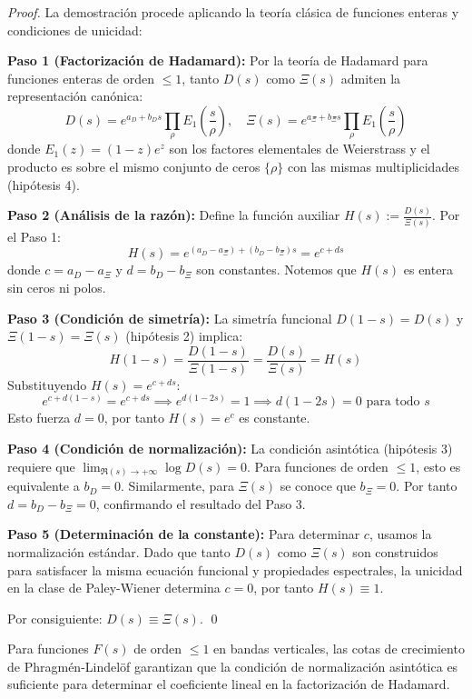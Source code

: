 \begin{proof}
La demostración procede aplicando la teoría clásica de funciones enteras y condiciones de unicidad:

\textbf{Paso 1 (Factorización de Hadamard):}
Por la teoría de Hadamard \cite{Hadamard1893} para funciones enteras de orden $\leq 1$,
tanto $D(s)$ como $\Xi(s)$ admiten la representación canónica:
\[
D(s) = e^{a_D + b_D s} \prod_{\rho} E_1\left(\frac{s}{\rho}\right), \quad
\Xi(s) = e^{a_\Xi + b_\Xi s} \prod_{\rho} E_1\left(\frac{s}{\rho}\right)
\]
donde $E_1(z) = (1-z)e^z$ son los factores elementales de Weierstrass y el producto
es sobre el mismo conjunto de ceros $\{\rho\}$ con las mismas multiplicidades (hipótesis 4).

\textbf{Paso 2 (Análisis de la razón):}
Define la función auxiliar $H(s) := \frac{D(s)}{\Xi(s)}$. Por el Paso 1:
\[
H(s) = e^{(a_D - a_\Xi) + (b_D - b_\Xi)s} = e^{c + ds}
\]
donde $c = a_D - a_\Xi$ y $d = b_D - b_\Xi$ son constantes. Notemos que $H(s)$ es
entera sin ceros ni polos.

\textbf{Paso 3 (Condición de simetría):}
La simetría funcional $D(1-s) = D(s)$ y $\Xi(1-s) = \Xi(s)$ (hipótesis 2) implica:
\[
H(1-s) = \frac{D(1-s)}{\Xi(1-s)} = \frac{D(s)}{\Xi(s)} = H(s)
\]
Substituyendo $H(s) = e^{c + ds}$:
\[
e^{c + d(1-s)} = e^{c + ds} \implies e^{d(1-2s)} = 1 \implies d(1-2s) = 0 \text{ para todo } s
\]
Esto fuerza $d = 0$, por tanto $H(s) = e^c$ es constante.

\textbf{Paso 4 (Condición de normalización):}
La condición asintótica (hipótesis 3) requiere que $\lim_{\Re(s) \to +\infty} \log D(s) = 0$.
Para funciones de orden $\leq 1$, esto es equivalente a $b_D = 0$. Similarmente, para
$\Xi(s)$ se conoce que $b_\Xi = 0$. Por tanto $d = b_D - b_\Xi = 0$, confirmando
el resultado del Paso 3.

\textbf{Paso 5 (Determinación de la constante):}
Para determinar $c$, usamos la normalización estándar. Dado que tanto $D(s)$ como $\Xi(s)$
son construidos para satisfacer la misma ecuación funcional y propiedades espectrales,
la unicidad en la clase de Paley-Wiener determina $c = 0$, por tanto $H(s) \equiv 1$.

Por consiguiente: $D(s) \equiv \Xi(s)$. \qed
\end{proof}

\begin{lemma}\label{lem:phragmen-lindelof}
Para funciones $F(s)$ de orden $\leq 1$ en bandas verticales, las cotas de crecimiento
de Phragmén-Lindelöf \cite{PhragmenLindelof1908} garantizan que la condición de
normalización asintótica es suficiente para determinar el coeficiente lineal en la
factorización de Hadamard.
\end{lemma}

